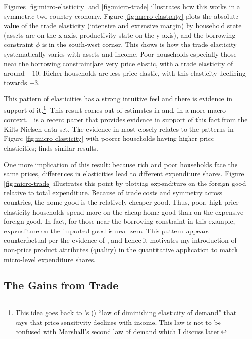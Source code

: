 \documentclass[12pt,pdftex]{article}
\def\citeapos#1{\citeauthor{#1}'s (\citeyear{#1})}
\begin{document}
\begin{onehalfspacing}
Figures \ref{fig:micro-elasticity} and \ref{fig:micro-trade} illustrates how this works in a symmetric two country economy. Figure \ref{fig:micro-elasticity} plots the absolute value of the trade elasticity (intensive and extensive margin) by household state (assets are on the x-axis, productivity state on the y-axis), and the borrowing constraint $\phi$ is in the south-west corner. This shows is how the trade elasticity systematically varies with assets and income. Poor households|especially those near the borrowing constraint|are very price elastic, with a trade elasticity of around $-10$. Richer households are less price elastic, with this elasticity declining towards $-3.$

This pattern of elasticities has a strong intuitive feel and there is evidence in support of it.\footnote{This idea goes back to \citeapos{harrod1936trade} ``law of diminishing elasticity of demand'' that says that price sensitivity declines with income. This law is not to be confused with Marshall's second law of demand which I discuss later.}. This result comes out of estimates in \citet{berry1995automobile} and, in a more macro context, \citet{nakamura2010accounting}. \citet{sangani2022markups} is a recent paper that provides evidence in support of this fact from the Kilts-Nielsen data set. The evidence in \citet{auer2022unequal} most closely relates to the patterns in Figure \ref{fig:micro-elasticity} with poorer households having higher price elasticities; \citet{colicev2022impact} finds similar results.

One more implication of this result: because rich and poor households face the same prices, differences in elasticities lead to different expenditure shares. Figure \ref{fig:micro-trade} illustrates this point by plotting expenditure on the foreign good relative to total expenditure. Because of trade costs and symmetry across countries, the home good is the relatively cheaper good. Thus, poor, high-price-elasticity households spend more on the cheap home good than on the expensive foreign good. In fact, for those near the borrowing constraint in this example, expenditure on the imported good is near zero. This pattern appears counterfactual per the evidence of \citet{borusyak2021distributional}, and hence it motivates my introduction of non-price product attributes (quality) in the quantitative application to match micro-level expenditure shares.

\subsection{The Gains from Trade}


\end{onehalfspacing}
\end{document}

